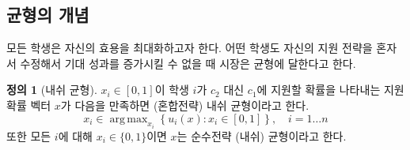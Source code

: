 \documentclass[12pt]{article} %
\DeclareMathOperator*{\argmax}{arg\,max}
\newif\ifEN
\theoremstyle{definition}
\newtheorem{definition}{Definition}
\theoremstyle{definition}
\newtheorem{definition}{정의}
\begin{document}
\ifEN{\subsection{Notion of equilibrium}} \else {\subsection{균형의 개념}} \fi
\ifEN{
Each student seeks to maximize her utility. The market reaches equilibrium when no student, acting alone, can increase her expected payoff by changing her application strategy.
\begin{definition}[Nash equilibrium]
The application probability vector $x$, where $x_i \in [0, 1]$ represents the probability that student $i$ applies to $c_1$ instead of $c_2$, is said to be a (mixed-strategy) \emph{Nash equilibrium} if 
\begin{equation}
x_i \in \argmax_{x_i} \left\{ u_i(x) : x_i \in [0, 1]\right\},\quad i = 1\dots n
\end{equation}
If, furthermore, $x_i \in \{0, 1\}$ for all $i$, then $x$ is called a \emph{pure-strategy} (Nash) equilibrium.
\end{definition}
} \else {
모든 학생은 자신의 효용을 최대화하고자 한다. 어떤 학생도 자신의 지원 전략을 혼자서 수정해서 기대 성과를 증가시킬 수 없을 때 시장은 균형에 달한다고 한다.
\begin{definition}[내쉬 균형]
$x_i \in [0, 1]$이 학생 $i$가 $c_2$ 대신 $c_1$에 지원할 확률을 나타내는 지원 확률 벡터 $x$가 다음을 만족하면 (혼합전략) 내쉬 균형이라고 한다.\begin{equation}
x_i \in \argmax_{x_i} \left\{ u_i(x) : x_i \in [0, 1]\right\},\quad i = 1\dots n
\end{equation}
또한 모든 $i$에 대해 $x_i \in \{0, 1\}$이면 $x$는 순수전략 (내쉬) 균형이라고 한다.
\end{definition}
} \fi
\end{document}
